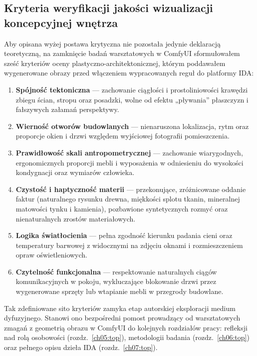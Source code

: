 \subsection{Kryteria weryfikacji jakości wizualizacji koncepcyjnej wnętrza}
\label{ch04:sec:checklista}

Aby opisana wyżej postawa krytyczna nie pozostała jedynie deklaracją teoretyczną, na zamknięcie badań warsztatowych w ComfyUI sformułowałem sześć kryteriów oceny plastyczno-architektonicznej, którym poddawałem wygenerowane obrazy przed włączeniem wypracowanych reguł do platformy IDA:
\begin{enumerate}
  \item \textbf{Spójność tektoniczna} --- zachowanie ciągłości i prostoliniowości krawędzi zbiegu ścian, stropu oraz posadzki, wolne od efektu „pływania” płaszczyzn i fałszywych załamań perspektywy.
  \item \textbf{Wierność otworów budowlanych} --- nienaruszona lokalizacja, rytm oraz proporcje okien i drzwi względem wyjściowej fotografii pomieszczenia.
  \item \textbf{Prawidłowość skali antropometrycznej} --- zachowanie wiarygodnych, ergonomicznych proporcji mebli i wyposażenia w odniesieniu do wysokości kondygnacji oraz wymiarów człowieka.
  \item \textbf{Czystość i haptyczność materii} --- przekonujące, zróżnicowane oddanie faktur (naturalnego rysunku drewna, miękkości splotu tkanin, mineralnej matowości tynku i kamienia), pozbawione syntetycznych rozmyć oraz nienaturalnych zrostów materiałowych.
  \item \textbf{Logika światłocienia} --- pełna zgodność kierunku padania cieni oraz temperatury barwowej z widocznymi na zdjęciu oknami i rozmieszczeniem opraw oświetleniowych.
  \item \textbf{Czytelność funkcjonalna} --- respektowanie naturalnych ciągów komunikacyjnych w pokoju, wykluczające blokowanie drzwi przez wygenerowane sprzęty lub wtapianie mebli w przegrody budowlane.
\end{enumerate}

Tak zdefiniowane sito kryteriów zamyka etap autorskiej eksploracji medium dyfuzyjnego. Stanowi ono bezpośredni pomost prowadzący od warsztatowych zmagań z geometrią obrazu w ComfyUI do kolejnych rozdziałów pracy: refleksji nad rolą osobowości (rozdz.~\ref{ch05:top}), metodologii badania (rozdz.~\ref{ch06:top}) oraz pełnego opisu dzieła IDA (rozdz.~\ref{ch07:top}).
